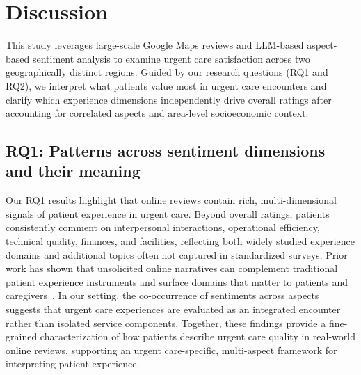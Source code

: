 \documentclass[journal,twoside,web]{ieeecolor}
\begin{document}
\section{Discussion}

This study leverages large-scale Google Maps reviews and LLM-based aspect-based sentiment analysis to examine urgent care satisfaction across two geographically distinct regions. Guided by our research questions (RQ1 and RQ2), we interpret what patients value most in urgent care encounters and clarify which experience dimensions independently drive overall ratings after accounting for correlated aspects and area-level socioeconomic context.

\subsection{RQ1: Patterns across sentiment dimensions and their meaning}
Our RQ1 results highlight that online reviews contain rich, multi-dimensional signals of patient experience in urgent care. Beyond overall ratings, patients consistently comment on interpersonal interactions, operational efficiency, technical quality, finances, and facilities, reflecting both widely studied experience domains and additional topics often not captured in standardized surveys. Prior work has shown that unsolicited online narratives can complement traditional patient experience instruments and surface domains that matter to patients and caregivers~\cite{ranard2016yelp,kilaru2016edreviews}. In our setting, the co-occurrence of sentiments across aspects suggests that urgent care experiences are evaluated as an integrated encounter rather than isolated service components. Together, these findings provide a fine-grained characterization of how patients describe urgent care quality in real-world online reviews, supporting an urgent care-specific, multi-aspect framework for interpreting patient experience.
\end{document}
